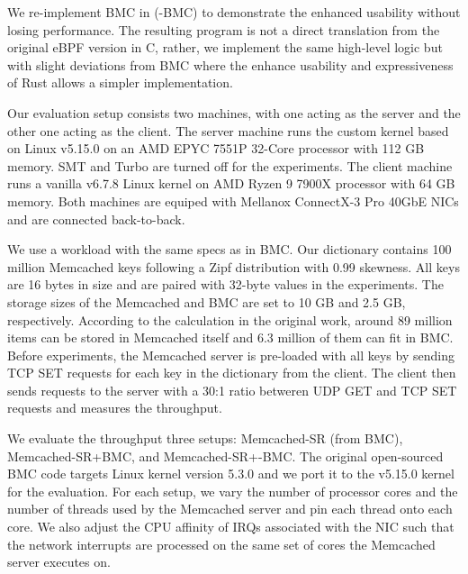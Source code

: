 We re-implement BMC in \projname{} (\projname{}-BMC) to demonstrate the
    enhanced usability without losing performance.
The resulting program is not a direct translation from the original eBPF
    version in C, rather, we implement the same high-level logic but with
    slight deviations from BMC where the enhance usability and expressiveness
    of Rust allows a simpler implementation.

Our evaluation setup consists two machines, with one
    acting as the server and the other one acting as the client.
The server machine runs the \projname{} custom kernel based on Linux v5.15.0 on
    an AMD EPYC 7551P 32-Core processor with 112 GB memory.
SMT and Turbo are turned off for the experiments.
The client machine runs a vanilla v6.7.8 Linux kernel on AMD Ryzen 9 7900X
    processor with 64 GB memory.
Both machines are equiped with Mellanox ConnectX-3 Pro 40GbE NICs and are
    connected back-to-back.


We use a workload with the same specs as in BMC.
Our dictionary contains 100 million Memcached keys following a Zipf
    distribution with 0.99 skewness.
All keys are 16 bytes in size and are paired with 32-byte values in the
    experiments.
The storage sizes of the Memcached and BMC are set to 10 GB and 2.5 GB,
    respectively.
According to the calculation in the original work, around 89 million items
    can be stored in Memcached itself and 6.3 million of them can fit in
    BMC.
Before experiments, the Memcached server is pre-loaded with all keys by
    sending TCP SET requests for each key in the dictionary from the client.
The client then sends requests to the server with a 30:1 ratio betweren UDP GET and
    TCP SET requests and measures the throughput.

We evaluate the throughput three setups: Memcached-SR (from BMC),
    Memcached-SR+BMC, and Memcached-SR+\projname{}-BMC.
The original open-sourced BMC code targets Linux kernel version 5.3.0 and we
    port it to the v5.15.0 \projname{} kernel for the evaluation.
For each setup, we vary the number of processor cores and the number of threads
    used by the Memcached server and pin each thread onto each core.
We also adjust the CPU affinity of IRQs associated with the NIC such that the
    network interrupts are processed on the same set of cores the Memcached
    server executes on.